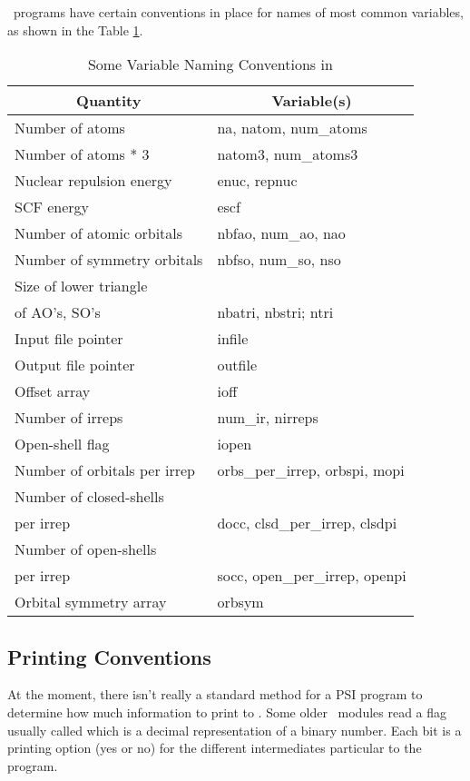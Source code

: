 \PSIthree\ programs have certain conventions in place for names of
most common variables, as shown in the Table \ref{tbl:VarNaming}.

\begin{table}
\caption{Some Variable Naming Conventions in \PSIthree}
\label{tbl:VarNaming}
\begin{center}
\begin{tabular}{ll}
\hline \hline
\multicolumn{1}{c}{Quantity} &
\multicolumn{1}{c}{Variable(s)} \\ \hline
Number of atoms              & na, natom, num\_atoms \\
Number of atoms * 3          & natom3, num\_atoms3 \\
Nuclear repulsion energy     & enuc, repnuc \\
SCF energy                   & escf \\
Number of atomic orbitals    & nbfao, num\_ao, nao \\
Number of symmetry orbitals  & nbfso, num\_so, nso \\
Size of lower triangle \\
\hspace{0.5cm} of AO's, SO's & nbatri, nbstri; ntri \\
Input file pointer           & infile \\
Output file pointer          & outfile \\
Offset array                 & ioff \\
Number of irreps             & num\_ir, nirreps \\
Open-shell flag              & iopen \\
Number of orbitals per irrep & orbs\_per\_irrep, orbspi, mopi \\
Number of closed-shells \\
\hspace{0.5cm} per irrep     & docc, clsd\_per\_irrep, clsdpi \\
Number of open-shells \\
\hspace{0.5cm} per irrep     & socc, open\_per\_irrep, openpi \\
Orbital symmetry array       & orbsym \\
\hline \hline
\end{tabular}
\end{center}
\end{table}

\subsection{Printing Conventions}
At the moment, there isn't really a standard method for a PSI program
to determine how much information to print to .  Some
older \PSIthree\ modules read a flag usually called 
which is a decimal representation of a binary number.  Each bit is a
printing option (yes or no) for the different intermediates particular
to the program.

